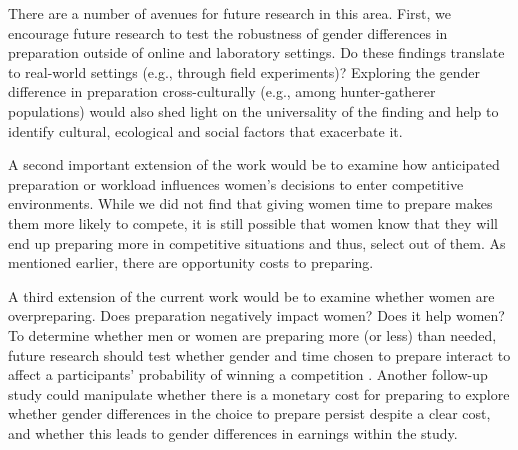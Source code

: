 \documentclass[a4paper, nobind]{templates/ociamthesis}
\begin{document}
There are a number of avenues for future research in this area. First, we encourage future research to test the robustness of gender differences in preparation outside of online and laboratory settings. Do these findings translate to real-world settings (e.g., through field experiments)? Exploring the gender difference in preparation cross-culturally (e.g., among hunter-gatherer populations) \autocite{Apicella2014a,Apicella2012,Apicella2017,Apicella2015,Apicella2009,Apicella2015a,Apicella2018,Apicella2007,Apicella2014,Apicella2016,Apicella2018a,Apicella2007a} would also shed light on the universality of the finding and help to identify cultural, ecological and social factors that exacerbate it.

A second important extension of the work would be to examine how anticipated preparation or workload influences women's decisions to enter competitive environments. While we did not find that giving women time to prepare makes them more likely to compete, it is still possible that women know that they will end up preparing more in competitive situations and thus, select out of them. As mentioned earlier, there are opportunity costs to preparing.

A third extension of the current work would be to examine whether women are overpreparing. Does preparation negatively impact women? Does it help women? To determine whether men or women are preparing more (or less) than needed, future research should test whether gender and time chosen to prepare interact to affect a participants' probability of winning a competition \autocite[see][]{Niederle2007}. Another follow-up study could manipulate whether there is a monetary cost for preparing to explore whether gender differences in the choice to prepare persist despite a clear cost, and whether this leads to gender differences in earnings within the study.
\end{document}
